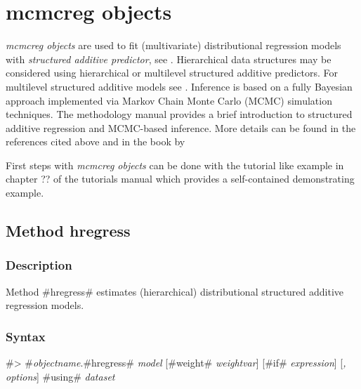 \chapter{mcmcreg objects}
\label{mcmcreg} 



{\em mcmcreg objects} are used to fit (multivariate) distributional regression models with {\em
structured additive predictor}, see . Hierarchical data structures may be considered using
hierarchical or multilevel structured additive predictors. For multilevel structured additive models  see
. Inference is based on a fully Bayesian approach implemented via Markov Chain Monte Carlo (MCMC)
simulation techniques. The methodology manual provides a brief introduction to structured additive regression and MCMC-based
inference. More details can be found in the references cited above and in the book by 

First steps with {\em mcmcreg objects} can be done with the
tutorial like example in chapter ?? of the
tutorials manual which provides a self-contained demonstrating
example.


\clearpage

\section{Method hregress}
\label{mcmcregress} 

\subsection{Description}
\label{mcmcregregressdescr}

Method #hregress# estimates (hierarchical) distributional structured additive regression models.

     

\subsection{Syntax}
\label{mcmcregregresssyntax}

 #> #{\em objectname}.#hregress# {\em model} [#weight# {\em weightvar}] [#if# {\em expression}] [{\em , options}] #using# {\em dataset}


